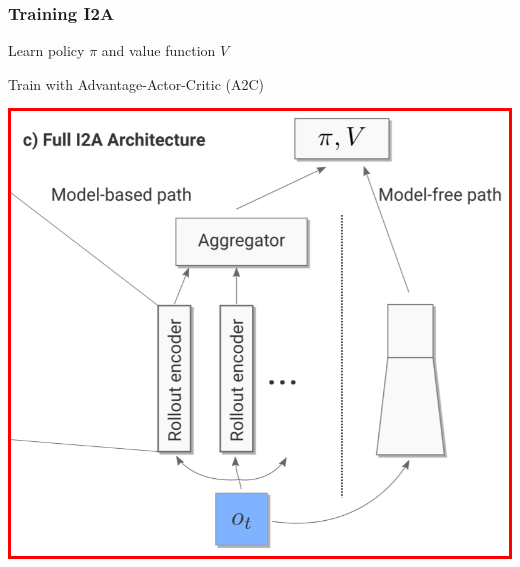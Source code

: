 \begin{frame}
    \frametitle{Training I2A}

\begin{multicols}{2}
	\begin{PraesentationAufzaehlung}
	    \item Learn policy $\pi$ and value function $V$
		\item Train with Advantage-Actor-Critic (A2C)
	\end{PraesentationAufzaehlung}
    \vfill\columnbreak
	\begin{center}
    \includegraphics[width=\columnwidth]{./Images/i2a_a2c.png}%
	\end{center}
\end{multicols}
    
\end{frame}
\clearpage

